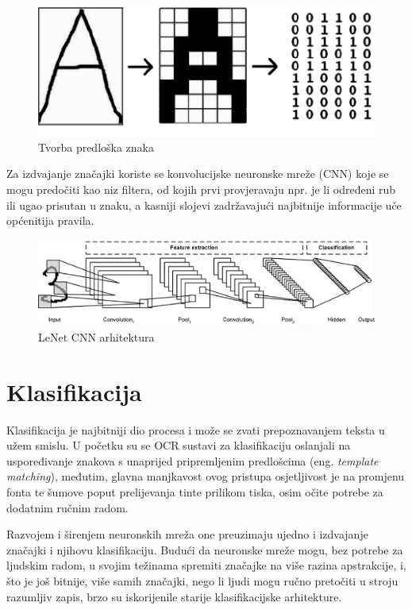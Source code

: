 \documentclass[zavrsnirad]{fer}
\begin{document}
\begin{figure}[hbt]
	\centering
	\includegraphics[width=0.7\linewidth]{Figures/simple-letter-matrix.png}
	\caption{Tvorba predloška znaka \cite{Noaman2015}}
	\label{slk:jednostavna-matrica}
\end{figure}

Za izdvajanje značajki koriste se konvolucijske neuronske mreže (CNN) koje se mogu predočiti kao niz filtera, od kojih prvi provjeravaju npr. je li određeni rub ili ugao prisutan u znaku, a kasniji slojevi zadržavajući najbitnije informacije uče općenitija pravila. \cite{IBM}

\begin{figure}[h!]
	\centering
	\includegraphics[width=0.9\linewidth]{Figures/CNN architecture.png} 
	\caption{LeNet CNN arhitektura \cite{IBM}}
	\label{slk:CNN-architecture}
\end{figure}

\section{Klasifikacija}

Klasifikacija je najbitniji dio procesa i može se zvati prepoznavanjem teksta u užem smislu. U početku su se OCR sustavi za klasifikaciju oslanjali na uspoređivanje znakova s unaprijed pripremljenim predlošcima (eng. \textit{template matching}), međutim, glavna manjkavost ovog pristupa osjetljivost je na promjenu fonta te šumove poput prelijevanja tinte prilikom tiska, osim očite potrebe za dodatnim ručnim radom.

Razvojem i širenjem neuronskih mreža one preuzimaju ujedno i izdvajanje značajki i njihovu klasifikaciju. Budući da neuronske mreže mogu, bez potrebe za ljudskim radom, u svojim težinama spremiti značajke na više razina apstrakcije, i, što je još bitnije, više samih značajki, nego li ljudi mogu ručno pretočiti u stroju razumljiv zapis, brzo su iskorijenile starije klasifikacijske arhitekture. \cite{Wang2012}
\end{document}
